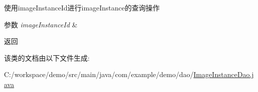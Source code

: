 使用image\+Instance\+Id进行image\+Instance的查询操作 
\begin{DoxyParams}{参数}
{\em image\+Instance\+Id} & \\
\hline
\end{DoxyParams}
\begin{DoxyReturn}{返回}

\end{DoxyReturn}


该类的文档由以下文件生成\+:\begin{DoxyCompactItemize}
\item 
C\+:/workspace/demo/src/main/java/com/example/demo/dao/\mbox{\hyperlink{_image_instance_dao_8java}{Image\+Instance\+Dao.\+java}}\end{DoxyCompactItemize}
